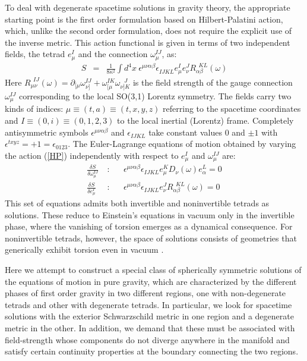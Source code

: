 \documentclass[preprint,aps,superscriptaddress,nofootinbib]{revtex4-1}
\newcommand{\del}{\partial}
\begin{document}
To deal with degenerate spacetime solutions in gravity theory, the 
appropriate starting point is  the first order formulation based on
Hilbert-Palatini action, which, unlike the second order formulation, 
does not require the explicit use of the inverse metric. This  action 
functional is given in terms of two independent fields, the tetrad 
$e_\mu^I$ and the connection $\omega_\mu^{IJ}$, as:
\begin{eqnarray}\label{HP}
S&=&\frac{1}{8\kappa^2}\int d^4 
x~\epsilon^{\mu\nu\alpha\beta}\epsilon^{}_{IJKL}
e_{\mu}^I e_\nu^J R_{\alpha \beta}^{~~KL}(\omega)
\end{eqnarray}
Here $R_{\mu \nu}^{~~IJ}(\omega)=\del_{[\mu}\omega^{IJ}_{\nu]}
+\omega^{IK}_{[\mu}\omega^{~~~J}_{\nu]K}$ is the field strength of 
the gauge connection $\omega_{\mu}^{IJ}$ corresponding to the local 
SO(3,1) Lorentz symmetry. The fields carry two kinds of indices: 
$\mu\equiv (t,a)\equiv(t,x,y,z)$ referring to the spacetime 
coordinates and $I\equiv(0,i)\equiv (0,1,2,3)$ to the local 
inertial (Lorentz) frame. Completely antisymmetric symbols 
$\epsilon^{\mu\nu\alpha\beta}$ and $\epsilon^{}_{IJKL}$ take 
constant values $0$ and $\pm 1$ with $\epsilon^{txyz}=+1
=\epsilon_{0123}$. The Euler-Lagrange equations of motion 
obtained by varying the action (\ref{HP}) independently with 
respect to $e_\mu^I$ and $\omega_\mu^{IJ}$  are:
\begin{eqnarray}\label{eom1}
\frac{\delta S}
{\delta\omega_{\mu}^{IJ}}~&:&~~~~\epsilon^{\mu\nu\alpha\beta}
\epsilon_{IJKL} e_\mu^K D_{\nu}(\omega)e_{\alpha}^L=0\\
\frac{\delta S}{\delta 
e_{\mu}^{I}}~&:&~~~~\epsilon^{\mu\nu\alpha\beta}\epsilon_{IJKL}
e_\nu^J R_{\alpha\beta}^{~~KL}(\omega)=0\label{eom2}
\end{eqnarray}
This set of equations admits both invertible and noninvertible tetrads 
as solutions. These reduce to Einstein's equations in vacuum only in 
the invertible phase, where the vanishing of torsion emerges as a 
dynamical consequence. For noninvertible tetrads, however, the 
space of solutions consists of geometries that generically exhibit 
torsion even in vacuum \cite{tseytlin,kaul,kaul1}. 
 

Here we attempt to construct a special class of spherically symmetric 
solutions of the equations of motion in pure gravity, which are 
characterized by the  different phases of first order gravity in 
two different regions, one with non-degenerate tetrads and other 
with degenerate tetrads. In particular, we look for spacetime 
solutions with the exterior Schwarzschild metric in one region and 
a degenerate metric in the other. In addition, we demand that these 
must be associated with field-strength whose  components  do not 
diverge anywhere in the manifold and satisfy certain continuity 
properties at the boundary connecting the two regions.
 
\end{document}
